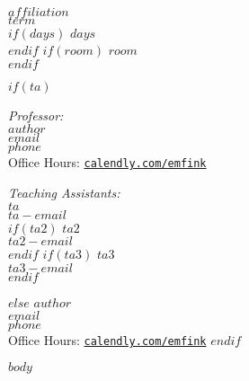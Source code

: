 \documentclass[12pt,letterpaper,twoside]{article}
\begin{document}
\thispagestyle{empty}


{\huge\bfseries{}} \\
\vspace{1em}

\begin{footnotesize}
{$affiliation$} \\
{$term$} \\
$if(days)$
{$days$} \\
$endif$
$if(room)$
{$room$} \\ 
$endif$
\vspace{1em}


$if(ta)$
\begin{minipage}[t]{2.5in} 
{\itshape{Professor:}}  \\
{$author$}  \\
\texttt{\href{mailto:{$email$}}{$email$}}  \\
{$phone$}  \\
{Office Hours: }\href{https://calendly.com/emfink}{\texttt{calendly.com/emfink}} 
\end{minipage}
\hfill     
\hfill
\begin{minipage}[t]{3in}
{\itshape{Teaching Assistants:}}  \\
{$ta$}  \\
\texttt{\href{mailto:{$ta-email$}}{$ta-email$}}  \\
$if(ta2)$
\vspace{0.5em}
{$ta2$}  \\
\texttt{\href{mailto:{$ta2-email$}}{$ta2-email$}}  \\
$endif$
$if(ta3)$
\vspace{0.5em}
{$ta3$}  \\
\texttt{\href{mailto:{$ta3-email$}}{$ta3-email$}}  \\
$endif$
\end{minipage}

$else$
{$author$}  \\
\texttt{\href{mailto:{$email$}}{$email$}}  \\
{$phone$}  \\
{Office Hours: }\href{https://calendly.com/emfink}{\texttt{calendly.com/emfink}} 
$endif$
\end{footnotesize}

\vspace{2em}




$body$
\end{document}
